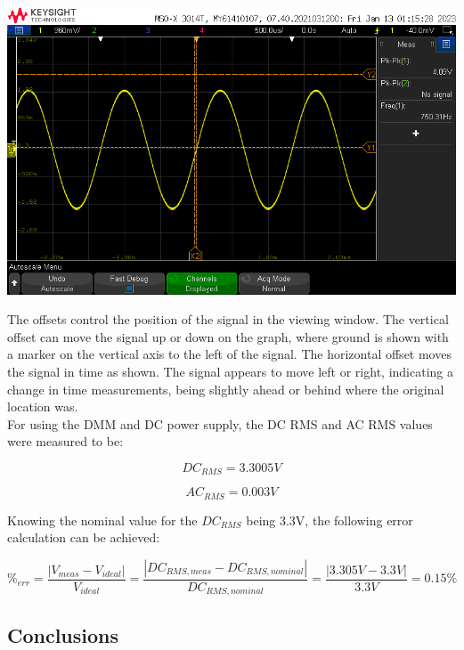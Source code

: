 \documentclass[notitlepage, 12pt]{report}  %
\begin{document}
\begin{center}
    \includegraphics[scale=0.5]{scope1.png}
\end{center}


The offsets control the position of the signal in the viewing window. The vertical offset can move the signal up 
or down on the graph, where ground is shown with a marker on the vertical axis to the left of the signal. The
horizontal offset moves the signal in time as shown. The signal appears to move left or right, indicating a 
change in time measurements, being slightly ahead or behind where the original location was. \\

For using the DMM and DC power supply, the DC RMS and AC RMS values were measured to be:

\begin{equation}
    DC_{RMS} = 3.3005V
\end{equation}

\begin{equation}
    AC_{RMS} = 0.003V
\end{equation}

Knowing the nominal value for the $DC_{RMS}$ being 3.3V, the following error calculation can be achieved:

\begin{equation}
    \%_{err} = \frac{|V_{meas} - V_{ideal}|}{V_{ideal}} = \frac{|DC_{RMS,meas} - DC_{RMS,nominal}|}{DC_{RMS,nominal}} = 
    \frac{|3.305V - 3.3V|}{3.3V} = 0.15\%
\end{equation}


\subsection*{Conclusions}
\end{document}
